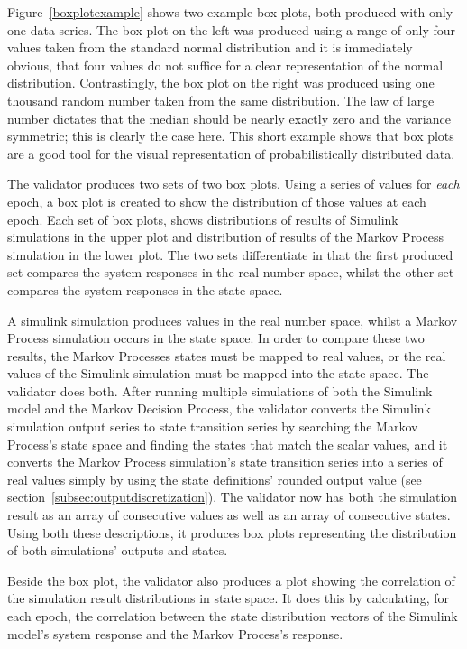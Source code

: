 Figure~\ref{boxplotexample} shows two example box plots, both produced with only one data series. The box plot on the left was produced using a range of only four values taken from the standard normal distribution and it is immediately obvious, that four values do not suffice for a clear representation of the normal distribution. Contrastingly, the box plot on the right was produced using one thousand random number taken from the same distribution. The law of large number dictates that the median should be nearly exactly zero and the variance symmetric; this is clearly the case here. This short example shows that box plots are a good tool for the visual representation of probabilistically distributed data.

The validator produces two sets of two box plots. Using a series of values for \textit{each} epoch, a box plot is created to show the distribution of those values at each epoch. Each set of box plots, shows distributions of results of Simulink simulations in the upper plot and distribution of results of the Markov Process simulation in the lower plot. The two sets differentiate in that the first produced set compares the system responses in the real number space, whilst the other set compares the system responses in the state space.

A simulink simulation produces values in the real number space, whilst a Markov Process simulation occurs in the state space. In order to compare these two results, the Markov Processes states must be mapped to real values, or the real values of the Simulink simulation must be mapped into the state space. The validator does both. After running multiple simulations of both the Simulink model and the Markov Decision Process, the validator converts the Simulink simulation output series to state transition series by searching the Markov Process's state space and finding the states that match the scalar values, and it converts the Markov Process simulation's state transition series into a series of real values simply by using the state definitions' rounded output value (see section~\ref{subsec:outputdiscretization}). The validator now has both the simulation result as an array of consecutive values as well as an array of consecutive states. Using both these descriptions, it produces box plots representing the distribution of both simulations' outputs and states.

Beside the box plot, the validator also produces a plot showing the correlation of the simulation result distributions in state space. It does this by calculating, for each epoch, the correlation between the state distribution vectors of the Simulink model's system response and the Markov Process's response.

